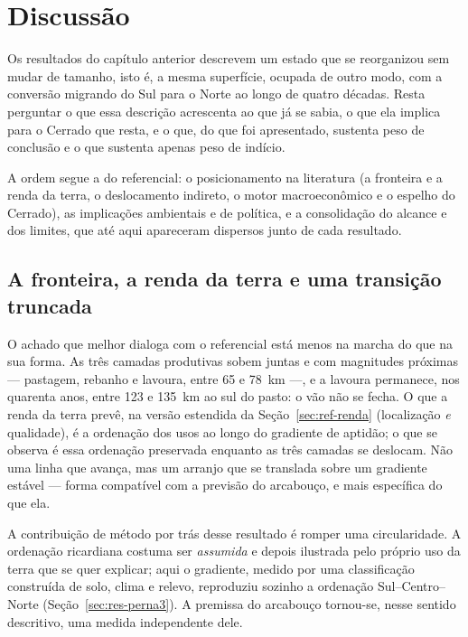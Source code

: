\chapter{Discussão}
\label{cap:discussao}

Os resultados do capítulo anterior descrevem um estado que se reorganizou
sem mudar de tamanho, isto é, a mesma superfície, ocupada de outro modo, com a
conversão migrando do Sul para o Norte ao longo de quatro décadas. Resta
perguntar o que essa descrição acrescenta ao que já se sabia, o que ela
implica para o Cerrado que resta, e o que, do que foi apresentado, sustenta
peso de conclusão e o que sustenta apenas peso de indício.

A ordem segue a do referencial: o posicionamento na literatura (a fronteira
e a renda da terra, o deslocamento indireto, o motor macroeconômico e o
espelho do Cerrado), as implicações ambientais e de política, e a
consolidação do alcance e dos limites, que até aqui apareceram dispersos junto
de cada resultado.

\section{A fronteira, a renda da terra e uma transição truncada}
\label{sec:disc-fronteira}

O achado que melhor dialoga com o referencial está menos na marcha do que na
sua forma. As três camadas produtivas sobem juntas e com magnitudes próximas
--- pastagem, rebanho e lavoura, entre 65 e 78~km ---, e a lavoura permanece,
nos quarenta anos, entre 123 e 135~km ao sul do pasto: o vão não se fecha. O
que a renda da terra prevê, na versão estendida da Seção~\ref{sec:ref-renda}
(localização \emph{e} qualidade), é a ordenação dos usos ao longo do gradiente
de aptidão; o que se observa é essa ordenação preservada enquanto as três
camadas se deslocam. Não uma linha que avança, mas um arranjo que se translada
sobre um gradiente estável --- forma compatível com a previsão do arcabouço, e
mais específica do que ela.

A contribuição de método por trás desse resultado é romper uma circularidade. A
ordenação ricardiana costuma ser \emph{assumida} e depois ilustrada pelo
próprio uso da terra que se quer explicar; aqui o gradiente, medido por uma
classificação construída de solo, clima e relevo, reproduziu sozinho a
ordenação Sul--Centro--Norte (Seção~\ref{sec:res-perna3}). A premissa do
arcabouço tornou-se, nesse sentido descritivo, uma medida independente dele.

